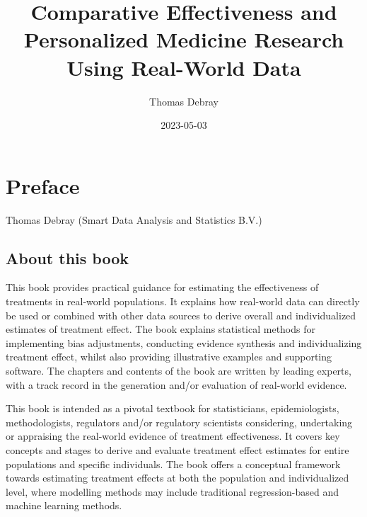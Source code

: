 \documentclass[
  letterpaper,
  DIV=11,
  numbers=noendperiod]{scrreprt}
\title{Comparative Effectiveness and Personalized Medicine Research
Using Real-World Data}
\author{Thomas Debray}
\date{2023-05-03}
\renewcommand*\contentsname{Table of contents}
\newcommand\contentsname{Table of contents}
\begin{document}
\maketitle
\ifdefined\Shaded\renewenvironment{Shaded}{\begin{tcolorbox}[breakable, enhanced, sharp corners, frame hidden, borderline west={3pt}{0pt}{shadecolor}, interior hidden, boxrule=0pt]}{\end{tcolorbox}}\fi

\renewcommand*\contentsname{Table of contents}
{
\hypersetup{linkcolor=}
\setcounter{tocdepth}{2}
\tableofcontents
}

\hypertarget{preface}{%
\chapter{Preface}\label{preface}}

Thomas Debray (Smart Data Analysis and Statistics B.V.)

\hfill\break

\hypertarget{about-this-book}{%
\section*{About this book}\label{about-this-book}}


This book provides practical guidance for estimating the effectiveness
of treatments in real-world populations. It explains how real-world data
can directly be used or combined with other data sources to derive
overall and individualized estimates of treatment effect. The book
explains statistical methods for implementing bias adjustments,
conducting evidence synthesis and individualizing treatment effect,
whilst also providing illustrative examples and supporting software. The
chapters and contents of the book are written by leading experts, with a
track record in the generation and/or evaluation of real-world evidence.

This book is intended as a pivotal textbook for statisticians,
epidemiologists, methodologists, regulators and/or regulatory scientists
considering, undertaking or appraising the real-world evidence of
treatment effectiveness. It covers key concepts and stages to derive and
evaluate treatment effect estimates for entire populations and specific
individuals. The book offers a conceptual framework towards estimating
treatment effects at both the population and individualized level, where
modelling methods may include traditional regression-based and machine
learning methods.
\end{document}
